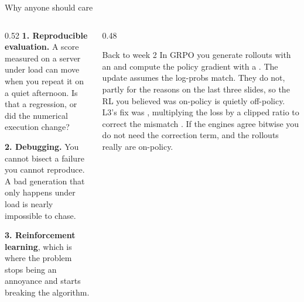\documentclass[aspectratio=169,10pt]{beamer}
\begin{document}
\begin{frame}[shrink=7]{Why anyone should care}
  \begin{columns}[T]
    \begin{column}{0.52\textwidth}
      \textbf{1. Reproducible evaluation.}
      A score measured on a server under load can move when you repeat it on a
      quiet afternoon. Is that a regression, or did the numerical execution
      change?
      \vspace{0.5em}

      \textbf{2. Debugging.}
      You cannot bisect a failure you cannot reproduce. A bad generation that
      only happens under load is nearly impossible to chase.
      \vspace{0.5em}

      \textbf{3. Reinforcement learning}, which is where the problem stops
      being an annoyance and starts breaking the algorithm.
    \end{column}
    \begin{column}{0.48\textwidth}
      \begin{block}{Back to week 2}
        \small
        In GRPO you generate rollouts with an  and
        compute the policy gradient with a . The update
        assumes the log-probs match.
        \vspace{0.3em}
        They do not, partly for the reasons on the last three slides, so the
        RL you believed was on-policy is quietly off-policy.
        \vspace{0.3em}
        L3's fix was , multiplying the loss
        by a clipped ratio to correct the mismatch .
        \vspace{0.3em}
        If the engines agree bitwise you do not need the correction term, and
        the rollouts really are on-policy.
      \end{block}
    \end{column}
  \end{columns}
\end{frame}
\end{document}
